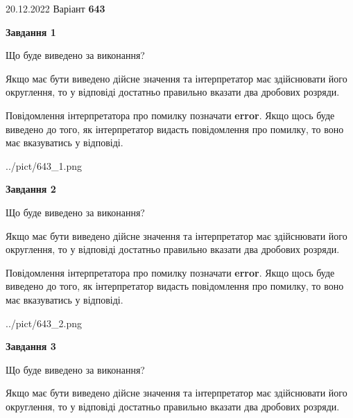 \documentclass[12pt, ukrainian]{article}
\begin{document}
{20.12.2022 Варіант \No \textbf { 643 }\par}
{
\begin {Large}

{\begin {center}\textbf{Завдання 1}\end {center}}\par
Що буде виведено за виконання? \par

Якщо має бути виведено дійсне значення та інтерпретатор має здійснювати його округлення, 
то у відповіді достатньо правильно вказати два дробових розряди.

Повідомлення інтерпретатора про помилку позначати \textbf{error}.
Якщо щось буде виведено до того, як інтерпретатор видасть повідомлення про помилку, 
то воно має вказуватись у відповіді. \par

\begin{center}
	{../pict/643_1.png}
\end{center}
\newpage

{\begin {center}\textbf{Завдання 2}\end {center}}\par
Що буде виведено за виконання? \par

Якщо має бути виведено дійсне значення та інтерпретатор має здійснювати його округлення, 
то у відповіді достатньо правильно вказати два дробових розряди.

Повідомлення інтерпретатора про помилку позначати \textbf{error}.
Якщо щось буде виведено до того, як інтерпретатор видасть повідомлення про помилку, 
то воно має вказуватись у відповіді. \par

\begin{center}
	{../pict/643_2.png}
\end{center}
\newpage

{\begin {center}\textbf{Завдання 3}\end {center}}\par
Що буде виведено за виконання? \par

Якщо має бути виведено дійсне значення та інтерпретатор має здійснювати його округлення, 
то у відповіді достатньо правильно вказати два дробових розряди.


\end{Large}}
\end{document}
